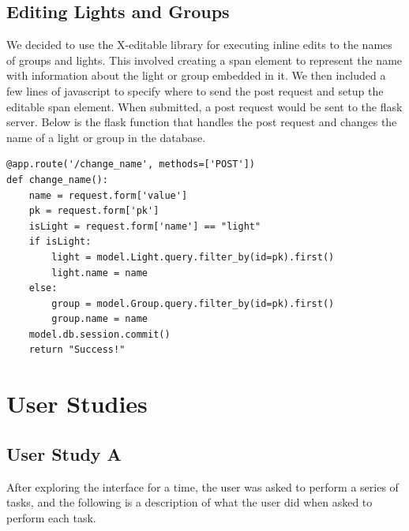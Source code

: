 \documentclass[oneside,openright]{book}
\begin{document}
\subsection{Editing Lights and Groups}

We decided to use the X-editable library for executing inline edits to the
names of groups and lights. This involved creating a span element to represent
the name with information about the light or group embedded in it. We then
included a few lines of javascript to specify where to send the post request
and setup the editable span element. When submitted, a post request would be
sent to the flask server. Below is the flask function that handles the post
request and changes the name of a light or group in the database.

\begin{lstlisting}
@app.route('/change_name', methods=['POST'])
def change_name():
    name = request.form['value']
    pk = request.form['pk']
    isLight = request.form['name'] == "light"
    if isLight:
        light = model.Light.query.filter_by(id=pk).first()
        light.name = name
    else:
        group = model.Group.query.filter_by(id=pk).first()
        group.name = name
    model.db.session.commit()
    return "Success!"
\end{lstlisting}

\section{User Studies}

\subsection{User Study A}

After exploring the interface for a time, the user was asked to perform a
series of tasks, and the following is a description of what the user did when
asked to perform each task.
\end{document}
